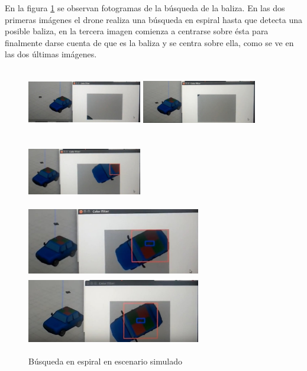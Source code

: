 En la figura \ref{f:Busqueda sobre el simulador} se observan fotogramas de la b\'usqueda de la baliza. En las dos primeras im\'agenes el drone realiza una b\'usqueda en espiral hasta que detecta una posible baliza, en la tercera imagen comienza a centrarse sobre \'esta para finalmente darse cuenta de que es la baliza y se centra sobre ella, como se ve en las dos \'ultimas im\'agenes.
\begin{figure}[H]
 \centering
    \includegraphics[width=5cm,height=3cm]{imgs/busqueda1.jpg}
    \includegraphics[width=5cm,height=3cm]{imgs/busqueda3.jpg}
    \includegraphics[width=5cm,height=3cm]{imgs/busqueda5.jpg}\\
    \includegraphics[width=7.6cm,height=3cm]{imgs/busqueda6.jpg}
    \includegraphics[width=7.6cm,height=3cm]{imgs/busqueda7.jpg}
 \caption{B\'usqueda en espiral en escenario simulado}
 \label{f:Busqueda sobre el simulador}
\end{figure}



